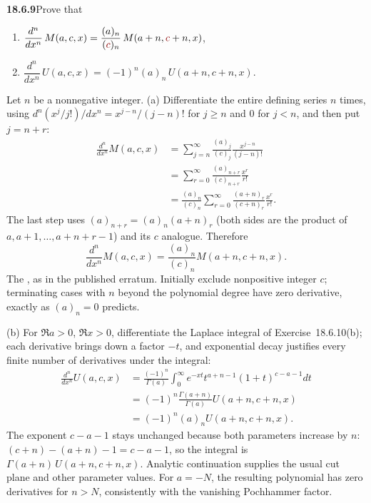 \par\bigskip
\noindent\textbf{18.6.9}\quad Prove that
\begin{enumerate}
\item[(a)] $\dfrac{d^{n}}{dx^{n}}\,M(a,c,x)
=\dfrac{(a)_{n}}{(\erratum{c})_{n}}\,M(a+n,\erratum{c}+n,x)$,
\item[(b)] $\dfrac{d^{n}}{dx^{n}}\,U(a,c,x)
=(-1)^{n}(a)_{n}\,U(a+n,c+n,x)$.
\end{enumerate}
\par\nobreak
\solution
Let $n$ be a nonnegative integer.
(a) Differentiate the entire defining series $n$ times, using
$d^n(x^j/j!)/dx^n=x^{j-n}/(j-n)!$ for $j\ge n$ and $0$ for $j<n$,
and then put $j=n+r$:
\begin{align*}
\frac{d^n}{dx^n}M(a,c,x)
 &=\sum_{j=n}^\infty\frac{(a)_j}{(c)_j}
                       \frac{x^{j-n}}{(j-n)!}\\
 &=\sum_{r=0}^\infty\frac{(a)_{n+r}}{(c)_{n+r}}
                       \frac{x^r}{r!}\\
 &=\frac{(a)_n}{(c)_n}
   \sum_{r=0}^\infty\frac{(a+n)_r}{(c+n)_r}\frac{x^r}{r!}.
\end{align*}
The last step uses $(a)_{n+r}=(a)_n(a+n)_r$ (both sides are the
product of $a,a+1,\ldots,a+n+r-1$) and its $c$ analogue.
Therefore
\[
\boxed{\frac{d^n}{dx^n}M(a,c,x)
 =\frac{(a)_n}{(c)_n}M(a+n,c+n,x)}.
\]
The ,
as in the published erratum.  Initially exclude nonpositive
integer $c$; terminating cases with $n$ beyond the polynomial
degree have zero derivative, exactly as $(a)_n=0$ predicts.

(b) For $\Re a>0$, $\Re x>0$, differentiate the Laplace
integral of Exercise~18.6.10(b); each derivative brings down a
factor $-t$, and exponential decay justifies every finite number
of derivatives under the integral:
\begin{align*}
\frac{d^n}{dx^n}U(a,c,x)
 &=\frac{(-1)^n}{\Gamma(a)}
     \int_0^\infty e^{-xt}t^{a+n-1}(1+t)^{c-a-1}dt\\
 &=(-1)^n\frac{\Gamma(a+n)}{\Gamma(a)}U(a+n,c+n,x)\\
 &=\boxed{(-1)^n(a)_nU(a+n,c+n,x)}.
\end{align*}
The exponent $c-a-1$ stays unchanged because both parameters
increase by $n$: $(c+n)-(a+n)-1=c-a-1$, so the integral is
$\Gamma(a+n)\,U(a+n,c+n,x)$.  Analytic continuation supplies the
usual cut plane and other parameter values.  For $a=-N$, the resulting
polynomial has zero derivatives for $n>N$, consistently with
the vanishing Pochhammer factor.


